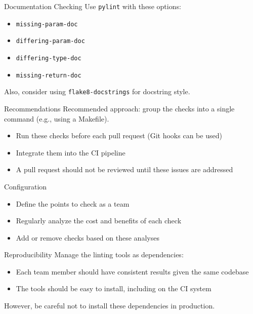 \begin{frame}{Documentation Checking}
  Use \texttt{pylint} with these options:
  
  \begin{itemize}
    \item \texttt{missing-param-doc}
    \item \texttt{differing-param-doc}
    \item \texttt{differing-type-doc}
    \item \texttt{missing-return-doc}
  \end{itemize}
  
  Also, consider using \texttt{flake8-docstrings} for docstring style.
\end{frame}

\begin{frame}{Recommendations}
  Recommended approach: group the checks into a single command (e.g., using a Makefile).
  
  \begin{itemize}
    \item Run these checks before each pull request (Git hooks can be used)
    \item Integrate them into the CI pipeline
    \item \alert{A pull request should not be reviewed until these issues are addressed}
  \end{itemize}
\end{frame}

\begin{frame}{Configuration}
  \begin{itemize}
    \item Define the points to check as a team
    \item Regularly analyze the cost and benefits of each check
    \item Add or remove checks based on these analyses
  \end{itemize}
\end{frame}

\begin{frame}{Reproducibility}
  Manage the linting tools as dependencies:
  
  \begin{itemize}
    \item Each team member should have consistent results given the same codebase
    \item The tools should be easy to install, including on the CI system
  \end{itemize}
  
  However, be careful not to install these dependencies in production.
\end{frame}
